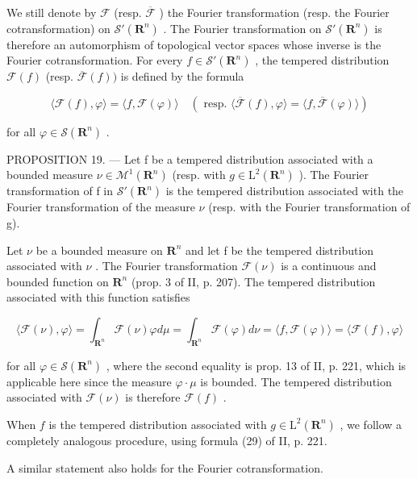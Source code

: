 We still denote by \(\mathcal{F}\) (resp. \(\overline{\mathcal{F}}\) ) the Fourier transformation (resp. the Fourier cotransformation) on \(\mathcal{S}'(\mathbf{R}^n)\) . The Fourier transformation on \(\mathcal{S}'(\mathbf{R}^n)\) is therefore an automorphism of topological vector spaces whose inverse is the Fourier cotransformation. For every \(f \in \mathcal{S}'(\mathbf{R}^n)\) , the tempered distribution \(\mathcal{F}(f)\) (resp. \(\overline{\mathcal{F}}(f) )\) is defined by the formula

\[
\langle \mathcal {F} (f), \varphi \rangle = \langle f, \mathcal {F} (\varphi) \rangle \quad (\text { resp. } \langle \overline {{\mathcal {F}}} (f), \varphi \rangle = \langle f, \overline {{\mathcal {F}}} (\varphi) \rangle)
\]

for all \(\varphi\in\mathcal{S}(\mathbf{R}^{n})\) .

PROPOSITION 19. --- Let f be a tempered distribution associated with a bounded measure \(\nu \in \mathcal{M}^{1}(\mathbf{R}^{n})\) (resp. with \(g \in \mathrm{L}^{2}(\mathbf{R}^{n})\) ). The Fourier transformation of f in \(\mathcal{S}'(\mathbf{R}^{n})\) is the tempered distribution associated with the Fourier transformation of the measure \(\nu\) (resp. with the Fourier transformation of g).

Let \(\nu\) be a bounded measure on \(\mathbf{R}^{n}\) and let f be the tempered distribution associated with \(\nu\) . The Fourier transformation \(\mathcal{F}(\nu)\) is a continuous and bounded function on \(\mathbf{R}^{n}\) (prop. 3 of II, p. 207). The tempered distribution associated with this function satisfies

\[
\langle \mathcal {F} (\nu), \varphi \rangle = \int_ {\mathbf {R} ^ {n}} \mathcal {F} (\nu) \varphi d \mu = \int_ {\mathbf {R} ^ {n}} \mathcal {F} (\varphi) d \nu = \langle f, \mathcal {F} (\varphi) \rangle = \langle \mathcal {F} (f), \varphi \rangle
\]

for all \(\varphi\in\mathcal{S}(\mathbf{R}^{n})\) , where the second equality is prop. 13 of II, p. 221, which is applicable here since the measure \(\varphi\cdot\mu\) is bounded. The tempered distribution associated with \(\mathcal{F}(\nu)\) is therefore \(\mathcal{F}(f)\) .

When \(f\) is the tempered distribution associated with \(g \in \mathrm{L}^2(\mathbf{R}^n)\) , we follow a completely analogous procedure, using formula (29) of II, p. 221.

A similar statement also holds for the Fourier cotransformation.

